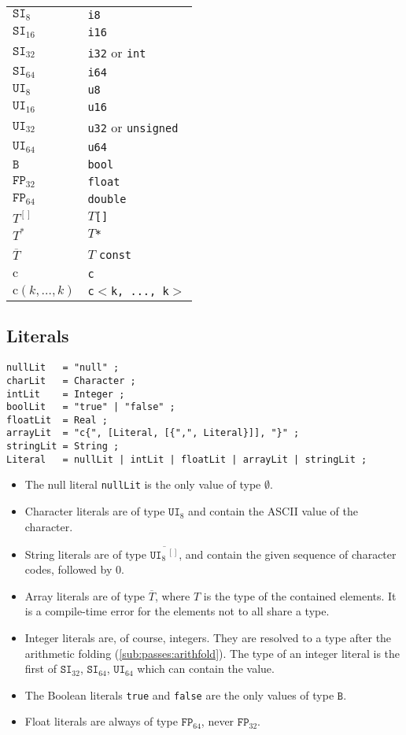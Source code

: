 \documentclass{article}
\newcommand{\R}[1]{\mathtt{#1}}
\begin{document}
\begin{tabular}{|l|l|}
\hline
$\R{SI}_8$ & \texttt{i8} \\
$\R{SI}_{16}$ & \texttt{i16} \\
$\R{SI}_{32}$ & \texttt{i32} or \texttt{int} \\
$\R{SI}_{64}$ & \texttt{i64} \\
$\R{UI}_8$ & \texttt{u8} \\
$\R{UI}_{16}$ & \texttt{u16} \\
$\R{UI}_{32}$ & \texttt{u32} or \texttt{unsigned} \\
$\R{UI}_{64}$ & \texttt{u64} \\
$\R{B}$ & \texttt{bool} \\
$\R{FP}_{32}$ & \texttt{float} \\
$\R{FP}_{64}$ & \texttt{double} \\
$T^{[]}$ & $T$\texttt{[]} \\
$T^*$ & $T$\texttt{*} \\
$\overline{T}$ & $T$ \texttt{const} \\
$\mathrm{c}$ & \texttt{c} \\
$\mathrm{c}(k,\ldots,k)$ & \texttt{c$<$k,~...,~k$>$} \\
\hline
\end{tabular}

\subsection{Literals}
\label{sub:types:literals}
\begin{verbatim}
nullLit   = "null" ;
charLit   = Character ;
intLit    = Integer ;
boolLit   = "true" | "false" ;
floatLit  = Real ;
arrayLit  = "c{", [Literal, [{",", Literal}]], "}" ;
stringLit = String ;
Literal   = nullLit | intLit | floatLit | arrayLit | stringLit ;
\end{verbatim}

\begin{itemize}
  \item{The null literal \texttt{nullLit} is the only value of type $\emptyset$.}
  \item{Character literals are of type $\R{UI}_{8}$ and contain the ASCII value
    of the character.}
  \item{String literals are of type $\overline{\R{UI}_{8}\,\!^{[]}}$, and contain
    the given sequence of character codes, followed by 0.}
  \item{Array literals are of type $\overline{T}$, where $T$ is the type of the
    contained elements. It is a compile-time error for the elements not to all
    share a type.}
  \item{Integer literals are, of course, integers. They are resolved to a type
    after the arithmetic folding (\ref{sub:passes:arithfold}). The type of an
    integer literal is the first of $\R{SI}_{32}$, $\R{SI}_{64}$, $\R{UI}_{64}$
    which can contain the value.}
  \item{The Boolean literals \texttt{true} and \texttt{false} are the only
    values of type $\R{B}$.}
  \item{Float literals are always of type $\R{FP}_{64}$, never $\R{FP}_{32}$.}
\end{itemize}
\end{document}

